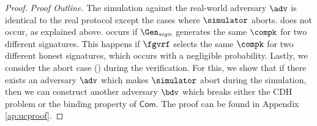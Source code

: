 \begin{proof}
	\textit{Proof Outline.} The  simulation against the real-world adversary $ \adv $ is identical to the real protocol except the cases where $ \simulator $ aborts.  does not occur, as explained above.   occurs if $ \Gen_{sign} $ generates the same $ \compk $ for two different signatures. This happens if $ \fgvrf $  selects the same $ \compk $ for two different honest signatures, which occurs with a negligible probability.
	Lastly, we consider the abort case () during the verification.
	For this, we show that if there exists an adversary $ \adv $ which makes $ \simulator $ abort during the simulation, then we can construct another adversary $ \bdv $ which breaks either the CDH problem or the binding property of $ \mathsf{Com}$. The proof can be found in Appendix \ref{ap:ucproof}.
	
	
\end{proof}

